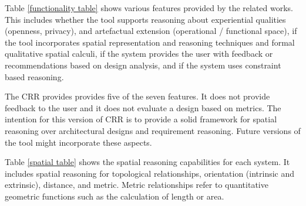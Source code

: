\documentclass[12pt]{ucthesis}
\begin{document}
Table \ref{functionality table} shows various features provided by the related works. This includes whether the tool supports reasoning about experiential qualities (openness, privacy), and artefactual extension (operational / functional space), if the tool incorporates spatial representation and reasoning techniques and formal qualitative spatial calculi, if the system provides the user with feedback or recommendations based on design analysis, and if the system uses constraint based reasoning.

\begin{table}[t]
  \begin{center}
  \end{center}
\caption{Related Work Features}
\label{functionality table}
\end{table} 

The CRR provides provides five of the seven features. It does not provide feedback to the user and it does not evaluate a design based on metrics. The intention for this version of CRR is to provide a solid framework for spatial reasoning over architectural designs and requirement reasoning. Future versions of the tool might incorporate these aspects. 

Table \ref{spatial table} shows the spatial reasoning capabilities for each system. It includes spatial reasoning for topological relationships, orientation (intrinsic and extrinsic), distance, and metric. Metric relationships refer to quantitative geometric functions such as the calculation of length or area.  
\end{document}
